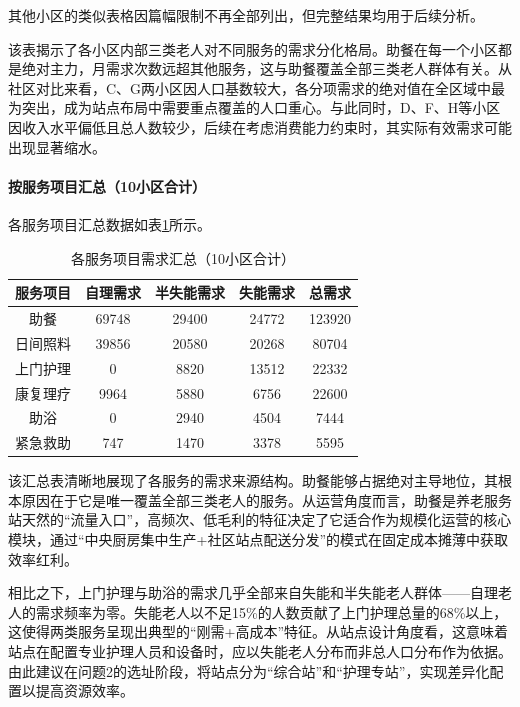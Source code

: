 \documentclass[UTF8]{ctexart}
\begin{document}
其他小区的类似表格因篇幅限制不再全部列出，但完整结果均用于后续分析。

该表揭示了各小区内部三类老人对不同服务的需求分化格局。助餐在每一个小区都是绝对主力，月需求次数远超其他服务，这与助餐覆盖全部三类老人群体有关。从社区对比来看，C、G两小区因人口基数较大，各分项需求的绝对值在全区域中最为突出，成为站点布局中需要重点覆盖的人口重心。与此同时，D、F、H等小区因收入水平偏低且总人数较少，后续在考虑消费能力约束时，其实际有效需求可能出现显著缩水。

\paragraph{按服务项目汇总（10小区合计）}
各服务项目汇总数据如表\ref{tab:service_total}所示。

\begin{table}[H]
\centering
\caption{各服务项目需求汇总（10小区合计）}
\label{tab:service_total}
\renewcommand{\arraystretch}{1.3}
\begin{tabular}{|c|c|c|c|c|}
\hline
\textbf{服务项目} & \textbf{自理需求} & \textbf{半失能需求} & \textbf{失能需求} & \textbf{总需求} \\
\hline
助餐 & 69748 & 29400 & 24772 & 123920 \\
\hline
日间照料 & 39856 & 20580 & 20268 & 80704 \\
\hline
上门护理 & 0 & 8820 & 13512 & 22332 \\
\hline
康复理疗 & 9964 & 5880 & 6756 & 22600 \\
\hline
助浴 & 0 & 2940 & 4504 & 7444 \\
\hline
紧急救助 & 747 & 1470 & 3378 & 5595 \\
\hline
\end{tabular}
\end{table}

该汇总表清晰地展现了各服务的需求来源结构。助餐能够占据绝对主导地位，其根本原因在于它是唯一覆盖全部三类老人的服务。从运营角度而言，助餐是养老服务站天然的“流量入口”，高频次、低毛利的特征决定了它适合作为规模化运营的核心模块，通过“中央厨房集中生产+社区站点配送分发”的模式在固定成本摊薄中获取效率红利。

相比之下，上门护理与助浴的需求几乎全部来自失能和半失能老人群体——自理老人的需求频率为零。失能老人以不足15\%的人数贡献了上门护理总量的68\%以上，这使得两类服务呈现出典型的“刚需+高成本”特征。从站点设计角度看，这意味着站点在配置专业护理人员和设备时，应以失能老人分布而非总人口分布作为依据。由此建议在问题2的选址阶段，将站点分为“综合站”和“护理专站”，实现差异化配置以提高资源效率。
\end{document}
